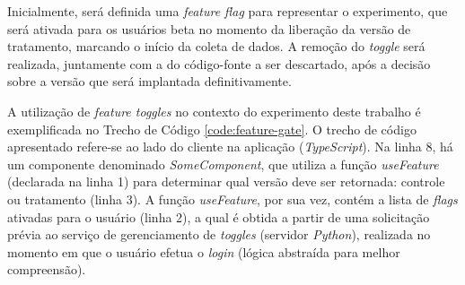 Inicialmente, será definida uma \textit{feature flag} para representar o experimento, que será ativada para os usuários beta no momento da liberação da versão de tratamento, marcando o início da coleta de dados. A remoção do \textit{toggle} será realizada, juntamente com a do código-fonte a ser descartado, após a decisão sobre a versão que será implantada definitivamente.

A utilização de \textit{feature toggles} no contexto do experimento deste trabalho é exemplificada no Trecho de Código \ref{code:feature-gate}. O trecho de código apresentado refere-se ao lado do cliente na aplicação (\textit{TypeScript}). Na linha 8, há um componente denominado \textit{SomeComponent}, que utiliza a função \textit{useFeature} (declarada na linha 1) para determinar qual versão deve ser retornada: controle ou tratamento (linha 3). A função \textit{useFeature}, por sua vez, contém a lista de \textit{flags} ativadas para o usuário (linha 2), a qual é obtida a partir de uma solicitação prévia ao serviço de gerenciamento de \textit{toggles} (servidor \textit{Python}), realizada no momento em que o usuário efetua o \textit{login} (lógica abstraída para melhor compreensão).

\vspace{\onelineskip}




